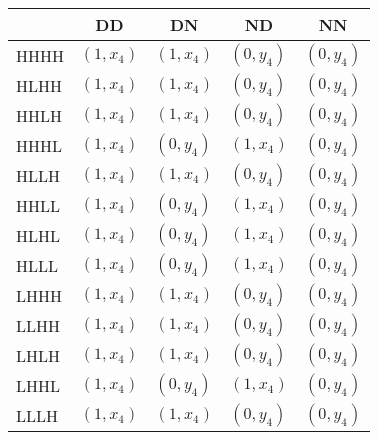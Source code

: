 \begin{tabular}{lrrrr}
\toprule
      & \multicolumn{1}{c}{DD} & \multicolumn{1}{c}{DN} & \multicolumn{1}{c}{ND} & \multicolumn{1}{c}{NN} \\
\midrule
HHHH  & \multicolumn{1}{l}{$( 1 , x_4 )$} & \multicolumn{1}{l}{$( 1 , x_4 )$} & \multicolumn{1}{l}{$( 0 , y_4 )$} & \multicolumn{1}{l}{$( 0 , y_4 )$} \\
HLHH  & \multicolumn{1}{l}{$( 1 , x_4 )$} & \multicolumn{1}{l}{$( 1 , x_4 )$} & \multicolumn{1}{l}{$( 0 , y_4 )$} & \multicolumn{1}{l}{$( 0 , y_4 )$} \\
HHLH  & \multicolumn{1}{l}{$( 1 , x_4 )$} & \multicolumn{1}{l}{$( 1 , x_4 )$} & \multicolumn{1}{l}{$( 0 , y_4 )$} & \multicolumn{1}{l}{$( 0 , y_4 )$} \\
HHHL  & \multicolumn{1}{l}{$( 1 , x_4 )$} & \multicolumn{1}{l}{$( 0 , y_4 )$} & \multicolumn{1}{l}{$( 1 , x_4 )$} & \multicolumn{1}{l}{$( 0 , y_4 )$} \\
HLLH  & \multicolumn{1}{l}{$( 1 , x_4 )$} & \multicolumn{1}{l}{$( 1 , x_4 )$} & \multicolumn{1}{l}{$( 0 , y_4 )$} & \multicolumn{1}{l}{$( 0 , y_4 )$} \\
HHLL  & \multicolumn{1}{l}{$( 1 , x_4 )$} & \multicolumn{1}{l}{$( 0 , y_4 )$} & \multicolumn{1}{l}{$( 1 , x_4 )$} & \multicolumn{1}{l}{$( 0 , y_4 )$} \\
HLHL  & \multicolumn{1}{l}{$( 1 , x_4 )$} & \multicolumn{1}{l}{$( 0 , y_4 )$} & \multicolumn{1}{l}{$( 1 , x_4 )$} & \multicolumn{1}{l}{$( 0 , y_4 )$} \\
HLLL  & \multicolumn{1}{l}{$( 1 , x_4 )$} & \multicolumn{1}{l}{$( 0 , y_4 )$} & \multicolumn{1}{l}{$( 1 , x_4 )$} & \multicolumn{1}{l}{$( 0 , y_4 )$} \\
LHHH  & \multicolumn{1}{l}{$( 1 , x_4 )$} & \multicolumn{1}{l}{$( 1 , x_4 )$} & \multicolumn{1}{l}{$( 0 , y_4 )$} & \multicolumn{1}{l}{$( 0 , y_4 )$} \\
LLHH  & \multicolumn{1}{l}{$( 1 , x_4 )$} & \multicolumn{1}{l}{$( 1 , x_4 )$} & \multicolumn{1}{l}{$( 0 , y_4 )$} & \multicolumn{1}{l}{$( 0 , y_4 )$} \\
LHLH  & \multicolumn{1}{l}{$( 1 , x_4 )$} & \multicolumn{1}{l}{$( 1 , x_4 )$} & \multicolumn{1}{l}{$( 0 , y_4 )$} & \multicolumn{1}{l}{$( 0 , y_4 )$} \\
LHHL  & \multicolumn{1}{l}{$( 1 , x_4 )$} & \multicolumn{1}{l}{$( 0 , y_4 )$} & \multicolumn{1}{l}{$( 1 , x_4 )$} & \multicolumn{1}{l}{$( 0 , y_4 )$} \\
LLLH  & \multicolumn{1}{l}{$( 1 , x_4 )$} & \multicolumn{1}{l}{$( 1 , x_4 )$} & \multicolumn{1}{l}{$( 0 , y_4 )$} & \multicolumn{1}{l}{$( 0 , y_4 )$} \\

\end{tabular}
